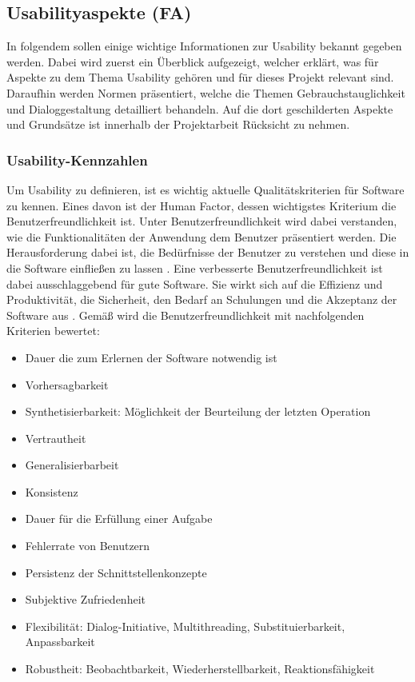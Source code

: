 \subsection{Usabilityaspekte (FA)}
\label{USABILITY_ASPEKTE}
In folgendem sollen einige wichtige Informationen zur Usability bekannt gegeben werden. Dabei wird zuerst ein Überblick aufgezeigt, welcher erklärt, was für Aspekte zu dem Thema Usability gehören und für dieses Projekt relevant sind. Daraufhin werden Normen präsentiert, welche die Themen Gebrauchstauglichkeit und Dialoggestaltung detailliert behandeln. Auf die dort geschilderten Aspekte und Grundsätze ist innerhalb der Projektarbeit Rücksicht zu nehmen.

\subsubsection{Usability-Kennzahlen}
Um Usability zu definieren, ist es wichtig aktuelle Qualitätskriterien für Software zu kennen. Eines davon ist der Human Factor, dessen wichtigstes Kriterium die Benutzerfreundlichkeit ist. Unter Benutzerfreundlichkeit wird dabei verstanden, wie die Funktionalitäten der Anwendung dem Benutzer präsentiert werden. Die Herausforderung dabei ist, die Bedürfnisse der Benutzer zu verstehen und diese in die Software einfließen zu lassen \cite{usability}.\newline 
Eine verbesserte Benutzerfreundlichkeit ist dabei ausschlaggebend für gute Software. Sie wirkt sich auf die Effizienz und Produktivität, die Sicherheit, den Bedarf an Schulungen und die Akzeptanz der Software aus \cite{usability}.
Gemäß \cite{usability} wird die Benutzerfreundlichkeit mit nachfolgenden Kriterien bewertet:
\begin{itemize}
	\item Dauer die zum Erlernen der Software notwendig ist
	\item Vorhersagbarkeit
	\item Synthetisierbarkeit: Möglichkeit der Beurteilung der letzten Operation
	\item Vertrautheit
	\item Generalisierbarbeit
	\item Konsistenz
	\item Dauer für die Erfüllung einer Aufgabe
	\item Fehlerrate von Benutzern
	\item Persistenz der Schnittstellenkonzepte
	\item Subjektive Zufriedenheit
	\item Flexibilität: Dialog-Initiative, Multithreading, Substituierbarkeit, Anpassbarkeit
	\item Robustheit: Beobachtbarkeit, Wiederherstellbarkeit, Reaktionsfähigkeit
\end{itemize}


